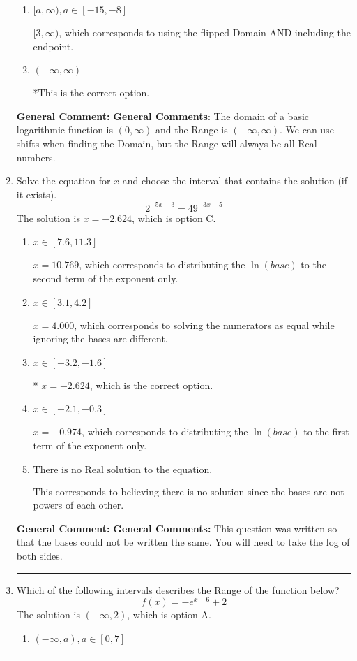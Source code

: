 \documentclass{extbook}[14pt]
\newcommand{\litem}[1]{\item #1

\rule{\textwidth}{0.4pt}}
\begin{document}
\begin{enumerate}
{\begin{enumerate}[label=\Alph*.]
$(-\infty, 3)$, which corresponds to using the vertical shift while the Range is $(-\infty, \infty)$.
\item \( [a, \infty), a \in [-15, -8] \)

$[3, \infty)$, which corresponds to using the flipped Domain AND including the endpoint.
\item \( (-\infty, \infty) \)

*This is the correct option.
\end{enumerate}

\textbf{General Comment:} \textbf{General Comments}: The domain of a basic logarithmic function is $(0, \infty)$ and the Range is $(-\infty, \infty)$. We can use shifts when finding the Domain, but the Range will always be all Real numbers.
}
\litem{
Solve the equation for $x$ and choose the interval that contains the solution (if it exists).
\[ 2^{-5x+3} = 49^{-3x-5} \]The solution is \( x = -2.624 \), which is option C.\begin{enumerate}[label=\Alph*.]
\item \( x \in [7.6, 11.3] \)

$x = 10.769$, which corresponds to distributing the $\ln(base)$ to the second term of the exponent only.
\item \( x \in [3.1, 4.2] \)

$x = 4.000$, which corresponds to solving the numerators as equal while ignoring the bases are different.
\item \( x \in [-3.2, -1.6] \)

* $x = -2.624$, which is the correct option.
\item \( x \in [-2.1, -0.3] \)

$x = -0.974$, which corresponds to distributing the $\ln(base)$ to the first term of the exponent only.
\item \( \text{There is no Real solution to the equation.} \)

This corresponds to believing there is no solution since the bases are not powers of each other.
\end{enumerate}

\textbf{General Comment:} \textbf{General Comments:} This question was written so that the bases could not be written the same. You will need to take the log of both sides.
}
\litem{
Which of the following intervals describes the Range of the function below?
\[ f(x) = -e^{x+6}+2 \]The solution is \( (-\infty, 2) \), which is option A.\begin{enumerate}[label=\Alph*.]
\item \( (-\infty, a), a \in [0, 7] \)


\end{enumerate}}
\end{enumerate}
\end{document}
